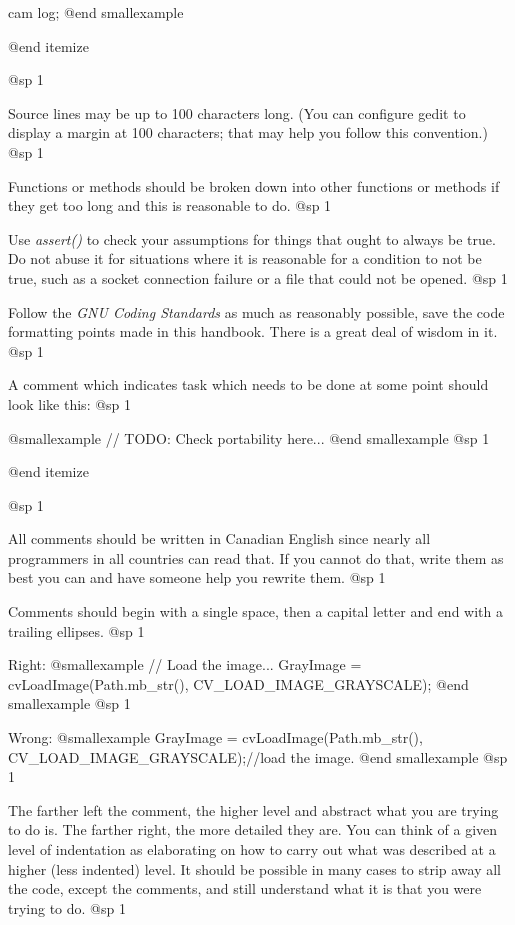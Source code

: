 cam log;
@end smallexample

@end itemize

@sp 1
\itemize
\item
Source lines may be up to 100 characters long. (You can configure gedit to display a margin at 100 characters; that may help you follow this convention.)
@sp 1

\item
Functions or methods should be broken down into other functions or methods if they get too long and this is reasonable to do.
@sp 1

\item
Use {\it assert()} to check your assumptions for things that ought to always be true. Do not abuse it for situations where it is reasonable for a condition to not be true, such as a socket connection failure or a file that could not be opened.
@sp 1

\item
Follow the {\it GNU Coding Standards} as much as reasonably possible, save the code formatting points made in this handbook. There is a great deal of wisdom in it.
@sp 1

\item
A comment which indicates task which needs to be done at some point should look like this: 
@sp 1

@smallexample
// TODO: Check portability here...
@end smallexample
@sp 1

@end itemize

@sp 1

\itemize
\item
All comments should be written in Canadian English since nearly all programmers in all countries can read that. If you cannot do that, write them as best you can and have someone help you rewrite them.
@sp 1

\item
Comments should begin with a single space, then a capital letter and end with a trailing ellipses. 
@sp 1

Right:
@smallexample
// Load the image...
GrayImage = cvLoadImage(Path.mb_str(), CV_LOAD_IMAGE_GRAYSCALE);
@end smallexample
@sp 1

Wrong:
@smallexample
GrayImage = cvLoadImage(Path.mb_str(), CV_LOAD_IMAGE_GRAYSCALE);//load the image.
@end smallexample
@sp 1

\item
The farther left the comment, the higher level and abstract what you are trying to do is. The farther right, the more detailed they are. You can think of a given level of indentation as elaborating on how to carry out what was described at a higher (less indented) level. It should be possible in many cases to strip away all the code, except the comments, and still understand what it is that you were trying to do.
@sp 1

